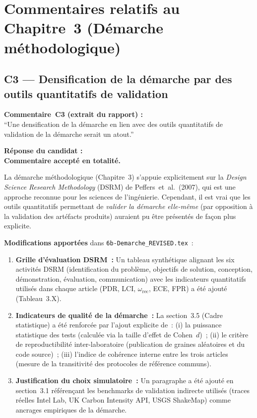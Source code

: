 \documentclass[12pt,a4paper]{article}
\newcommand{\Commentaire}[2]{%
  \begin{reviewerbox}
    \textbf{Commentaire~#1 (extrait du rapport) :}\\#2
  \end{reviewerbox}%
}
\newcommand{\Reponse}[1]{%
  \begin{responsebox}
    \textbf{Réponse du candidat :}\\#1
  \end{responsebox}%
}
\begin{document}
\section*{Commentaires relatifs au Chapitre~3 (Démarche méthodologique)}

\subsection*{C3 --- Densification de la démarche par des outils quantitatifs de validation}

\Commentaire{C3}{
  ``Une densification de la démarche en lien avec des outils quantitatifs de validation de la
  démarche serait un atout.''
}

\Reponse{
\textbf{Commentaire accepté en totalité.}

La démarche méthodologique (Chapitre~3) s'appuie explicitement sur la \emph{Design Science Research Methodology} (DSRM) de Peffers~et~al.\ (2007), qui est une approche reconnue pour les sciences de l'ingénierie. Cependant, il est vrai que les outils quantitatifs permettant de \emph{valider la démarche elle-même} (par opposition à la validation des artéfacts produits) auraient pu être présentés de façon plus explicite.

\textbf{Modifications apportées} dans \texttt{6b-Demarche\_REVISED.tex}~:
\begin{enumerate}[leftmargin=*]
  \item \textbf{Grille d'évaluation DSRM~:} Un tableau synthétique alignant les six activités DSRM (identification du problème, objectifs de solution, conception, démonstration, évaluation, communication) avec les indicateurs quantitatifs utilisés dans chaque article (PDR, LCI, $\omega_{\text{rec}}$, ECE, FPR) a été ajouté (Tableau~3.X).
  \item \textbf{Indicateurs de qualité de la démarche~:} La section~3.5 (Cadre statistique) a été renforcée par l'ajout explicite de~: (i) la puissance statistique des tests (calculée via la taille d'effet de Cohen~$d$)~; (ii) le critère de reproductibilité inter-laboratoire (publication de graines aléatoires et du code source)~; (iii) l'indice de cohérence interne entre les trois articles (mesure de la transitivité des protocoles de référence communs).
  \item \textbf{Justification du choix simulatoire~:} Un paragraphe a été ajouté en section~3.1 référençant les benchmarks de validation indirecte utilisés (traces réelles Intel Lab, UK Carbon Intensity API, USGS ShakeMap) comme ancrages empiriques de la démarche.
\end{enumerate}
}
\end{document}
